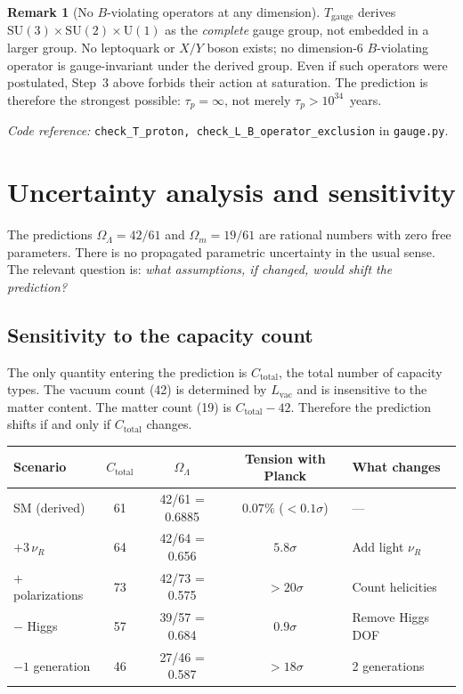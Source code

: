 \documentclass[11pt,a4paper]{article}
\theoremstyle{definition}
\newtheorem{remark}[theorem]{Remark}
\newcommand{\SU}{\mathrm{SU}}
\newcommand{\U}{\mathrm{U}}
\newcommand{\coderef}[2]{\smallskip\noindent\textit{Code reference:} \texttt{#1} in \texttt{#2}.}
\begin{document}
\begin{remark}[No $B$-violating operators at any dimension]
$T_{\mathrm{gauge}}$ derives $\SU(3) \times \SU(2) \times \U(1)$ as
the \emph{complete} gauge group, not embedded in a larger group.  No
leptoquark or $X/Y$ boson exists; no dimension-6 $B$-violating
operator is gauge-invariant under the derived group.  Even if such
operators were postulated, Step~3 above forbids their action at
saturation.  The prediction is therefore the strongest possible:
$\tau_p = \infty$, not merely $\tau_p > 10^{34}$~years.
\end{remark}

\coderef{check\_T\_proton, check\_L\_B\_operator\_exclusion}{gauge.py}


\section{Uncertainty analysis and sensitivity}
\label{sec:uncertainty}


The predictions $\Omega_\Lambda = 42/61$ and $\Omega_m = 19/61$ are
rational numbers with zero free parameters.  There is no propagated
parametric uncertainty in the usual sense.  The relevant question is:
\emph{what assumptions, if changed, would shift the prediction?}

\subsection{Sensitivity to the capacity count}
\label{sec:sensitivity}

The only quantity entering the prediction is $C_{\mathrm{total}}$, the
total number of capacity types.  The vacuum count (42) is determined by
$L_{\mathrm{vac}}$ and is insensitive to the matter content.  The matter
count (19) is $C_{\mathrm{total}} - 42$.  Therefore the prediction shifts
if and only if $C_{\mathrm{total}}$ changes.

\smallskip
\begin{center}
\small
\begin{tabular}{@{}lcccl@{}}
\toprule
\textbf{Scenario} & $C_{\mathrm{total}}$ & $\Omega_\Lambda$ &
  \textbf{Tension with Planck} & \textbf{What changes} \\
\midrule
SM (derived) & 61 & 42/61 = 0.6885 & $0.07\%$ ($<0.1\sigma$) & --- \\
$+3\,\nu_R$ & 64 & 42/64 = 0.656 & $5.8\sigma$ & Add light $\nu_R$ \\
$+$ polarizations & 73 & 42/73 = 0.575 & $>20\sigma$ & Count helicities \\
$-$ Higgs & 57 & 39/57 = 0.684 & $0.9\sigma$ & Remove Higgs DOF \\
$-1$ generation & 46 & 27/46 = 0.587 & $>18\sigma$ & 2 generations \\
\bottomrule
\end{tabular}
\end{center}
\end{document}
